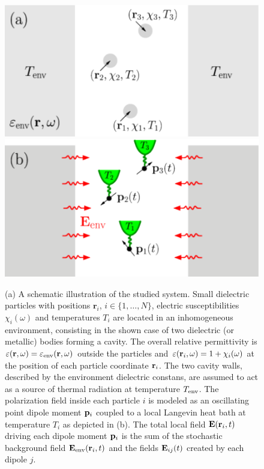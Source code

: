 \begin{figure}
 \includegraphics[width=.49\columnwidth]{pics/dipole_pic1a.pdf}
 \includegraphics[width=.49\columnwidth]{pics/dipole_pic1b.pdf}
 \caption{(a) A schematic illustration of the studied system. Small dielectric particles with positions $\mathbf{r}_i$, $i\in\{1,\dots,N\}$, electric susceptibilities $\chi_i(\omega)$ and temperatures $T_i$ are located in an inhomogeneous environment, consisting in the shown case of two dielectric (or metallic) bodies forming a cavity. The overall relative permittivity is $\varepsilon(\mathbf{r},\omega)=\varepsilon_{\textrm{env}}(\mathbf{r},\omega)$ outside the particles and $\varepsilon(\mathbf{r}_i,\omega)=1+\chi_i(\omega)$ at the position of each particle coordinate $\mathbf{r}_i$. The two cavity walls, described by the environment dielectric constans, are assumed to act as a source of thermal radiation at temperature $T_{\textrm{env}}$. The polarization field inside each particle $i$ is modeled as an oscillating point dipole moment $\mathbf{p}_i$ coupled to a local Langevin heat bath at temperature $T_i$ as depicted in (b). The total local field $\mathbf{E}(\mathbf{r}_i,t)$ driving each dipole moment $\mathbf{p}_i$ is the sum of the stochastic background field $\mathbf{E}_{\textrm{env}}(\mathbf{r}_i,t)$ and the fields $\mathbf{E}_{ij}(t)$ created by each dipole $j$.}%
\label{fig:gfm_dipole_system}
\end{figure}

